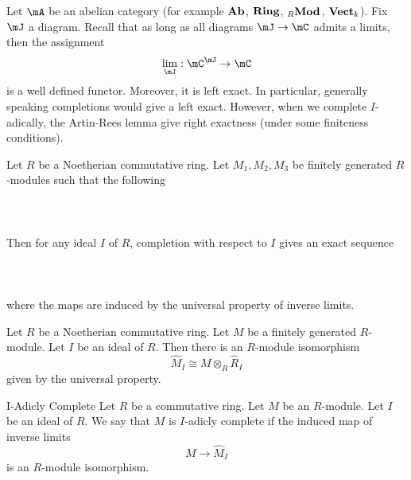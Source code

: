 \documentclass[a4paper]{article}
\begin{document}
Let $\mA$ be an abelian category (for example $\bold{Ab}$, $\bold{Ring}$, ${_R\bold{Mod}}$, $\bold{Vect}_k$). Fix $\mJ$ a diagram. Recall that as long as all diagrams $\mJ\to\mC$ admits a limits, then the assignment $$\lim_\mJ:\mC^\mJ\to\mC$$ is a well defined functor. Moreover, it is left exact. In particular, generally speaking completions would give a left exact. However, when we complete $I$-adically, the Artin-Rees lemma give right exactness (under some finiteness conditions). 

\begin{prp}{}{} Let $R$ be a Noetherian commutative ring. Let $M_1,M_2,M_3$ be finitely generated $R$-modules such that the following \\~\\
 \\~\\
Then for any ideal $I$ of $R$, completion with respect to $I$ gives an exact sequence \\~\\
 \\~\\
where the maps are induced by the universal property of inverse limits. 
\end{prp}

\begin{prp}{}{} Let $R$ be a Noetherian commutative ring. Let $M$ be a finitely generated $R$-module. Let $I$ be an ideal of $R$. Then there is an $R$-module isomorphism $$\widehat{M}_I\cong M\otimes_R\widehat{R}_I$$ given by the universal property. 
\end{prp}

\begin{defn}{I-Adicly Complete}{} Let $R$ be a commutative ring. Let $M$ be an $R$-module. Let $I$ be an ideal of $R$. We say that $M$ is $I$-adicly complete if the induced map of inverse limits $$M\to\widehat{M}_I$$ is an $R$-module isomorphism. 
\end{defn}
\end{document}
